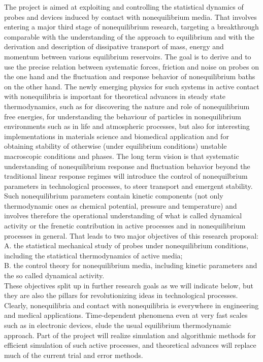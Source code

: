 The project is aimed at exploiting and controlling the statistical dynamics of probes and devices induced by contact with nonequilibrium media.  That involves entering a major third stage of nonequilibrium research, targeting a breakthrough comparable with the understanding of the approach to equilibrium and with the derivation and description of dissipative transport of mass, energy and momentum between various equilibrium reservoirs.  The goal is to derive and to use the precise relation between systematic forces, friction and noise on probes on the one hand and the fluctuation and response behavior of nonequilibrium baths on the other hand.  The newly emerging physics for such systems in active contact with nonequilibria is important for theoretical advances in steady state thermodynamics, such as for discovering the nature and role of nonequilibrium free energies, for understanding the behaviour of particles in nonequilibrium environments such as in life and atmospheric processes, but also for interesting implementations in materials science and biomedical application and for obtaining stability of otherwise (under equilibrium conditions) unstable macroscopic conditions and phases. The long term vision is that systematic understanding of nonequilibrium response and fluctuation behavior beyond the traditional linear response regimes will introduce the control of nonequilbrium parameters in technological processes, to steer transport and emergent stability.  Such nonequilibrium parameters contain kinetic components (not only thermodynamic ones as chemical potential, pressure and temperature) and involves therefore the operational understanding of what is called dynamical activity or the frenetic contribution in active processes and in nonequilibrium processes in general. That leads to two major objectives of this research proposal:\\
 A. the statistical mechanical study of probes under nonequilibrium conditions, including the statistical thermodynamics of active media;\\
 B. the control theory for nonequilibrium media, including kinetic parameters and the so called dynamical activity.\\
 These objectives split up in further research goals as we will indicate below, but they are also the pillars for revolutionizing ideas in technological processes.  Clearly, nonequilibria and contact with nonequilibria is everywhere in engineering and medical applications.  Time-dependent phenomena even at very fast scales such as in electronic devices, elude the usual equilibrium thermodynamic approach. Part of the project will realize simulation and algorithmic methods for efficient simulation of such active processes, and theoretical advances will replace much of the current trial and error methods.
